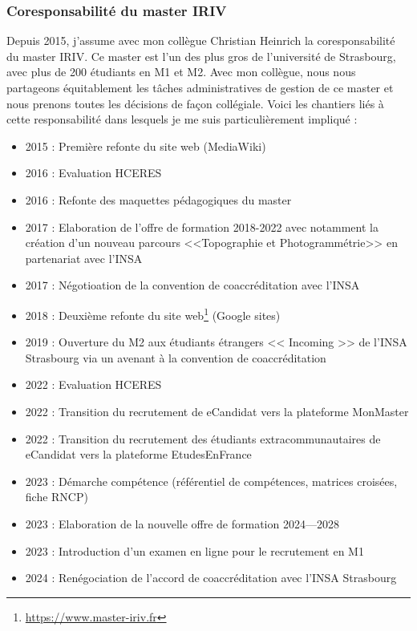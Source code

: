\documentclass[a4paper,12pt]{article}
\begin{document}

\subsubsection{Coresponsabilité du master IRIV}

Depuis 2015, j’assume avec mon collègue Christian Heinrich la coresponsabilité du master IRIV. Ce master est l’un des plus gros de l’université de Strasbourg, avec plus de 200 étudiants en M1 et M2. Avec mon collègue, nous nous partageons équitablement les tâches administratives de gestion de ce master et nous prenons toutes les décisions de façon collégiale. Voici les chantiers liés à cette responsabilité dans lesquels je me suis particulièrement impliqué :
\begin{itemize}
    \item 2015 : Première refonte du site web (MediaWiki)
    \item 2016 : Evaluation HCERES
    \item 2016 : Refonte des maquettes pédagogiques du master
    \item 2017 : Elaboration de l'offre de formation 2018-2022 avec notamment la création d'un nouveau parcours <<Topographie et Photogrammétrie>> en partenariat avec l'INSA
    \item 2017 : Négotioation de la convention de coaccréditation avec l'INSA
    \item 2018 : Deuxième refonte du site web\footnote{\url{https://www.master-iriv.fr}} (Google sites)
    \item 2019 : Ouverture du M2 aux étudiants étrangers << Incoming >> de l’INSA Strasbourg via un avenant à la convention de coaccréditation
    \item 2022 : Evaluation HCERES
    \item 2022 : Transition du recrutement de eCandidat vers la plateforme MonMaster
    \item 2022 : Transition du recrutement des étudiants extracommunautaires de eCandidat vers la plateforme EtudesEnFrance
    \item 2023 : Démarche compétence (référentiel de compétences, matrices croisées, fiche RNCP)
    \item 2023 : Elaboration de la nouvelle offre de formation 2024—2028
    \item 2023 : Introduction d’un examen en ligne pour le recrutement en M1
    \item 2024 : Renégociation de l’accord de coaccréditation avec l’INSA Strasbourg
\end{itemize}
\end{document}
